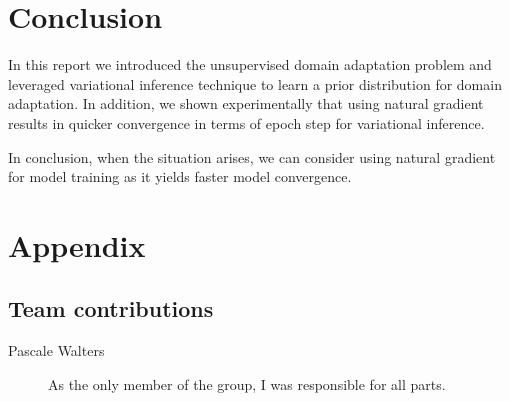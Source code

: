 \documentclass[10pt,twocolumn,letterpaper]{article}
\begin{document}
\section{Conclusion}

In this report we introduced the unsupervised domain adaptation problem and leveraged variational inference technique to learn a prior distribution for domain adaptation.
In addition, we shown experimentally that using natural gradient results in quicker convergence in terms of epoch step for variational inference.

In conclusion, when the situation arises, we can consider using natural gradient for model training as it yields faster model convergence.
{\small


}

\section*{Appendix}

\subsection*{Team contributions}

\begin{description}
\item[Pascale Walters] As the only member of the group, I was responsible for all parts.
\end{description}
\end{document}

